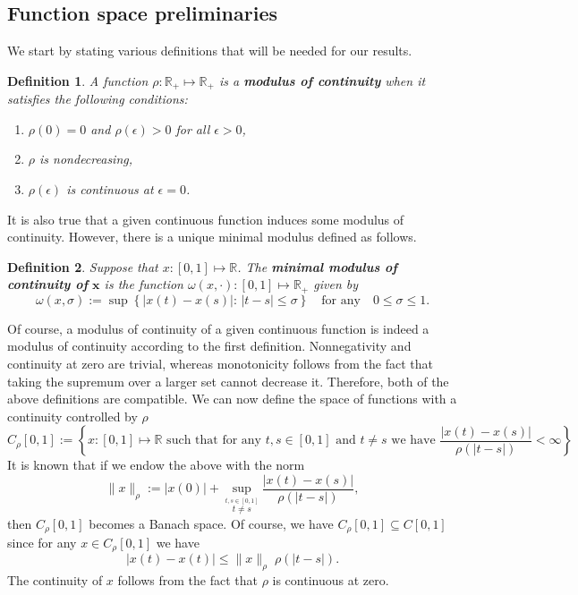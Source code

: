 \documentclass[12pt,a4paper]{article}
\newtheorem{df}{Definition}
\begin{document}
\subsection{Function space preliminaries}
We start by stating various definitions that will be needed for our results.
\begin{df}
	A function $\rho: \mathbb{R}_+ \mapsto \mathbb{R}_+$ is a \textbf{modulus of continuity} when it satisfies the following conditions:
	\begin{enumerate}
		\item [i)] $\rho(0) = 0$ and $\rho(\epsilon) > 0$ for all $\epsilon > 0$,
		\item [ii)] $\rho$ is nondecreasing,
		\item [iii)] $\rho(\epsilon)$ is continuous at $\epsilon = 0$.
	\end{enumerate}
\end{df}
\noindent It is also true that a given continuous function induces some modulus of continuity. However, there is a unique minimal modulus defined as follows. 
\begin{df}
	Suppose that $x: [0,1] \mapsto \mathbb{R}$. The \textbf{minimal modulus of continuity of} $\mathbf{x}$ is the function $\omega(x, \cdot): [0,1] \mapsto \mathbb{R}_+$ given by
	\begin{equation}
		\omega(x, \sigma) := \sup\left\{|x(t) - x(s)|: \, |t-s| \leq \sigma\right\} \quad \text{for any} \quad 0 \leq \sigma \leq 1.
	\end{equation}
\end{df}
\noindent Of course, a modulus of continuity of a given continuous function is indeed a modulus of continuity according to the first definition. Nonnegativity and continuity at zero are trivial, whereas monotonicity follows from the fact that taking the supremum over a larger set cannot decrease it. Therefore, both of the above definitions are compatible. We can now define the space of functions with a continuity controlled by $\rho$
\begin{equation}
	C_\rho[0,1] := \left\{x: [0,1] \mapsto \mathbb{R} \text{ such that for any } t, s\in [0,1] \text{ and } t\neq s \text{ we have } \frac{|x(t)- x(s)|}{\rho(|t-s|)} < \infty \right\}.
\end{equation} 
It is known that if we endow the above with the norm
\begin{equation}
	\|x\|_\rho := |x(0)| + \sup_{\stackrel{t,s\in [0,1]}{ t \neq s}} \frac{|x(t)- x(s)|}{\rho(|t-s|)},
\end{equation} 
then $C_\rho[0,1]$ becomes a Banach space. Of course, we have $C_\rho[0,1] \subseteq C[0,1]$ since for any $x\in C_\rho[0,1]$ we have
\begin{equation}
	|x(t) - x(t)| \leq \|x\|_\rho \; \rho(|t-s|).
\end{equation}
The continuity of $x$ follows from the fact that $\rho$ is continuous at zero. 
\end{document}
